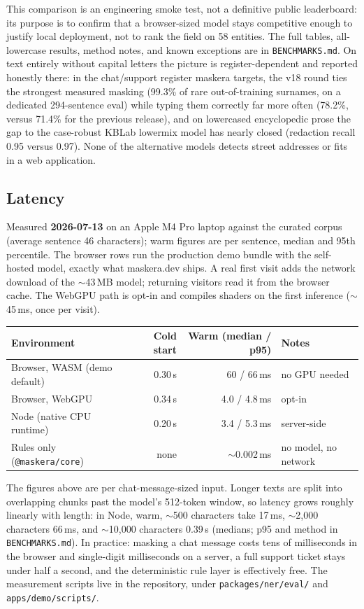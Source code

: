 \documentclass[10pt,a4paper]{article}
\newcommand{\pkg}[1]{\texttt{#1}}
\begin{document}
This comparison is an engineering smoke test, not a definitive public
leaderboard: its purpose is to confirm that a browser-sized model stays
competitive enough to justify local deployment, not to rank the field on
58 entities. The full tables, all-lowercase results, method notes, and
known exceptions are in \pkg{BENCHMARKS.md}. On text entirely without
capital letters the picture is register-dependent and reported honestly
there: in the chat/support register maskera targets, the v18 round ties the
strongest measured masking (99.3\% of rare out-of-training surnames, on a
dedicated 294-sentence eval) while typing them correctly far more often
(78.2\%, versus 71.4\% for the previous release), and on lowercased
encyclopedic prose the gap to the case-robust KBLab lowermix model has
nearly closed (redaction recall 0.95 versus 0.97). None of the alternative
models detects street addresses or fits in a web application.

\subsection{Latency}

Measured \textbf{2026-07-13} on an Apple M4 Pro laptop against the curated
corpus (average sentence 46 characters); warm figures are per sentence,
median and 95th percentile. The browser rows run the production demo bundle
with the self-hosted model, exactly what maskera.dev ships. A real first
visit adds the network download of the $\sim$43\,MB model; returning
visitors read it from the browser cache. The WebGPU path is opt-in and
compiles shaders on the first inference ($\sim$45\,ms, once per visit).

\begin{table}[H]
\centering
\small
\begin{tabular}{lrrl}
\toprule
Environment & Cold start & Warm (median / p95) & Notes \\
\midrule
Browser, WASM (demo default) & 0.30\,s & 60 / 66\,ms & no GPU needed \\
Browser, WebGPU & 0.34\,s & 4.0 / 4.8\,ms & opt-in \\
Node (native CPU runtime) & 0.20\,s & 3.4 / 5.3\,ms & server-side \\
Rules only (\pkg{@maskera/core}) & none & $\sim$0.002\,ms & no model, no network \\
\bottomrule
\end{tabular}
\end{table}

The figures above are per chat-message-sized input. Longer texts are
split into overlapping chunks past the model's 512-token window, so
latency grows roughly linearly with length:
in Node, warm, $\sim$500 characters take 17\,ms, $\sim$2{,}000 characters
66\,ms, and $\sim$10{,}000 characters 0.39\,s (medians; p95 and method in
\pkg{BENCHMARKS.md}). In practice: masking a chat message costs tens of
milliseconds in the browser and single-digit milliseconds on a server, a
full support ticket stays under half a second, and the deterministic rule
layer is effectively free. The measurement scripts live in the repository,
under \pkg{packages/ner/eval/} and \pkg{apps/demo/scripts/}.
\end{document}

